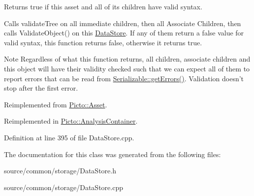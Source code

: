Returns true if this asset and all of its children have valid syntax. 

Calls validate\-Tree on all immediate children, then all Associate Children, then calls Validate\-Object() on this \hyperlink{class_picto_1_1_data_store}{Data\-Store}. If any of them return a false value for valid syntax, this function returns false, otherwise it returns true. \begin{DoxyNote}{Note}
Regardless of what this function returns, all children, associate children and this object will have their validity checked such that we can expect all of them to report errors that can be read from \hyperlink{class_picto_1_1_serializable_a9b14c771646820d10e082d351cd4cf50}{Serializable\-::get\-Errors()}. Validation doesn't stop after the first error. 
\end{DoxyNote}


Reimplemented from \hyperlink{class_picto_1_1_asset_a348f19144d26a035faebd628734038dd}{Picto\-::\-Asset}.



Reimplemented in \hyperlink{class_picto_1_1_analysis_container_af6f0f3307b57e468ee6331c2470c70a3}{Picto\-::\-Analysis\-Container}.



Definition at line 395 of file Data\-Store.\-cpp.



The documentation for this class was generated from the following files\-:\begin{DoxyCompactItemize}
\item 
source/common/storage/Data\-Store.\-h\item 
source/common/storage/Data\-Store.\-cpp\end{DoxyCompactItemize}
